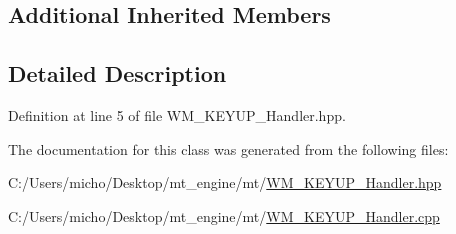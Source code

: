 \subsection*{Additional Inherited Members}


\subsection{Detailed Description}


Definition at line 5 of file W\+M\+\_\+\+K\+E\+Y\+U\+P\+\_\+\+Handler.\+hpp.



The documentation for this class was generated from the following files\+:\begin{DoxyCompactItemize}
\item 
C\+:/\+Users/micho/\+Desktop/mt\+\_\+engine/mt/\hyperlink{_w_m___k_e_y_u_p___handler_8hpp}{W\+M\+\_\+\+K\+E\+Y\+U\+P\+\_\+\+Handler.\+hpp}\item 
C\+:/\+Users/micho/\+Desktop/mt\+\_\+engine/mt/\hyperlink{_w_m___k_e_y_u_p___handler_8cpp}{W\+M\+\_\+\+K\+E\+Y\+U\+P\+\_\+\+Handler.\+cpp}\end{DoxyCompactItemize}
